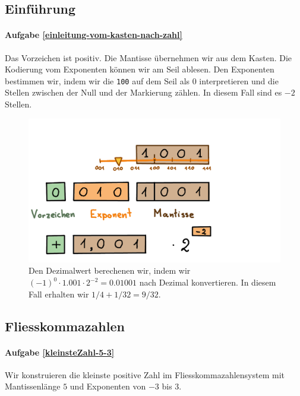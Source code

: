 \subsection{Einführung}
\paragraph{Aufgabe \ref{einleitung-vom-kasten-nach-zahl}}
Das Vorzeichen ist positiv. Die Mantisse übernehmen wir aus dem Kasten. Die Kodierung vom Exponenten können wir am Seil ablesen. Den Exponenten bestimmen wir, indem wir die \texttt{100} auf dem Seil als \(0\) interpretieren und die Stellen zwischen der Null und der Markierung zählen. In diesem Fall sind es \(-2\) Stellen.
\begin{figure}[H]
\centering
\includegraphics[width=0.8\linewidth]{Pictures/Einleitung_from_Kasten_Loesung.png} 
Den Dezimalwert berechenen wir, indem wir \((-1)^0 \cdot 1.001 \cdot 2^{-2} = 0.01001\) nach Dezimal konvertieren. In diesem Fall erhalten wir \(1/4 + 1/32 = 9/32\).
\end{figure}

\subsection{Fliesskommazahlen}

\paragraph{Aufgabe \ref{kleinsteZahl-5-3}}
Wir konstruieren die kleinste positive Zahl im Fliesskommazahlensystem mit Mantissenlänge \(5\) und Exponenten von \(-3\) bis \(3\).

